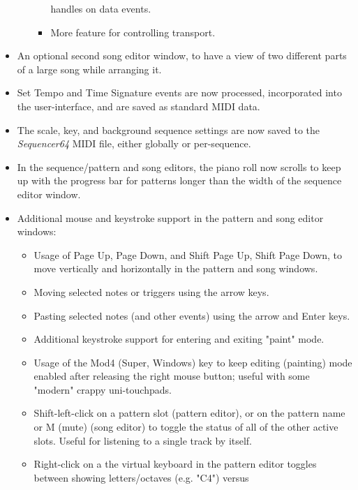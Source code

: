 \documentclass[
 11pt,
 twoside,
 a4paper,
 headinclude,
 footinclude,
 final                                 %
]{article}
\begin{document}
\begin{itemize}
\begin{itemize}
\begin{itemize}
               handles on data events.
            \item More feature for controlling transport.
         \end{itemize}
      \end{itemize}
      \item An optional second song editor window, to have a view
         of two different parts of a large song while arranging it.
      \item Set Tempo and Time Signature events are
         now processed, incorporated into the user-interface, and are saved
         as standard MIDI data.
      \item The scale, key, and background sequence
         settings are now saved to the \textsl{Sequencer64} MIDI file, either
         globally or per-sequence.
      \item In the sequence/pattern and song editors, the piano roll
         now scrolls to keep up with the progress bar for patterns longer than
         the width of the sequence editor window.
      \item Additional mouse and keystroke support in the pattern and song
         editor windows:
      \begin{itemize}
         \item Usage of Page Up, Page Down, and Shift Page Up, Shift Page Down,
            to move vertically and horizontally in the pattern and song
            windows.
         \item Moving selected notes or triggers using the arrow keys.
         \item Pasting selected notes (and other events) using the arrow and
            Enter keys.
         \item Additional keystroke support for entering and exiting "paint"
            mode.
         \item Usage of the Mod4 (Super, Windows) key to keep editing
            (painting) mode enabled after releasing the right mouse button;
            useful with some "modern" crappy uni-touchpads.
         \item Shift-left-click on a pattern slot (pattern editor),
            or on the pattern name or M (mute) (song editor)
            to toggle the status of all of the other active slots.
            Useful for listening to a single track by itself.
         \item Right-click on a the virtual keyboard in the pattern editor
            toggles between showing letters/octaves (e.g. "C4") versus

\end{itemize}
\end{itemize}
\end{document}
